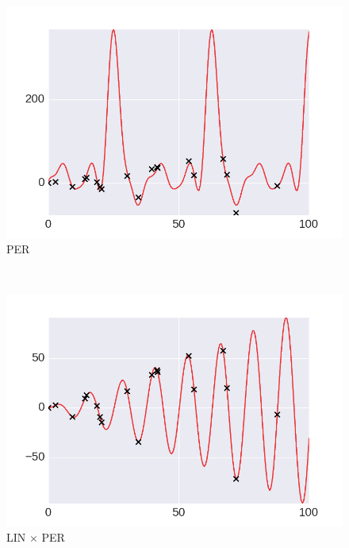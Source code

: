     \begin{subfigure}[b]{0.3\textwidth}
        \includegraphics[width=\textwidth]{figs/composition/composition_demo_PER.png}
        \caption{PER}
    \end{subfigure}
    ~ %
    \begin{subfigure}[b]{0.3\textwidth}
        \includegraphics[width=\textwidth]{figs/composition/composition_demo_LINxPER.png}
        \caption{LIN $\times$ PER}
    \end{subfigure}


